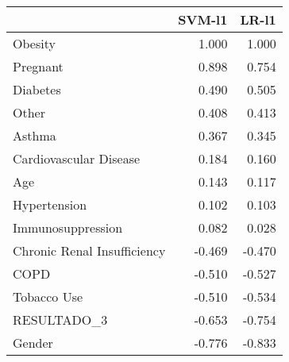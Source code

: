 \begin{tabular}{lrr}
\toprule
{} &  SVM-l1 &  LR-l1 \\
\midrule
Obesity                     &   1.000 &  1.000 \\
Pregnant                    &   0.898 &  0.754 \\
Diabetes                    &   0.490 &  0.505 \\
Other                       &   0.408 &  0.413 \\
Asthma                      &   0.367 &  0.345 \\
Cardiovascular Disease      &   0.184 &  0.160 \\
Age                         &   0.143 &  0.117 \\
Hypertension                &   0.102 &  0.103 \\
Immunosuppression           &   0.082 &  0.028 \\
Chronic Renal Insufficiency &  -0.469 & -0.470 \\
COPD                        &  -0.510 & -0.527 \\
Tobacco Use                 &  -0.510 & -0.534 \\
RESULTADO\_3                 &  -0.653 & -0.754 \\
Gender                      &  -0.776 & -0.833 \\
\bottomrule
\end{tabular}
